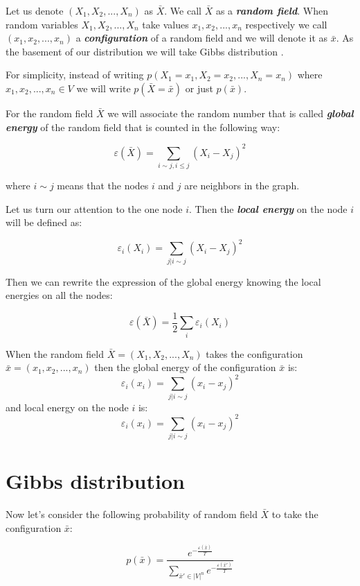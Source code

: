 \documentclass[12pt]{report}
\begin{document}
Let us denote $(X_1, X_2, ..., X_n)$ as $\bar{X}$. We call $\bar{X}$ as a \textit{\textbf{random field}}. When random variables $X_1, X_2, ..., X_n$ take values $x_1, x_2, ..., x_n$ respectively we call $(x_1, x_2, ..., x_n)$ a \textit{\textbf{configuration}} of a random field and we will denote it as $\bar{x}$. As the basement of our distribution we will take Gibbs distribution \cite{bremaud2013markov}.

For simplicity, instead of writing $p(X_1 = x_1, X_2 = x_2, ...,  X_n = x_n)$ where $x_1, x_2, ..., x_n \in V$ we will write $p(\bar{X} = \bar{x})$ or just $p(\bar{x})$.

For the random field $\bar{X}$ we will associate the random number that is called \textit{\textbf{global energy}} of the random field that is counted in the following way:

$$ \varepsilon (\bar{X}) =  \sum\limits_{i \sim j, i \leq j} (X_i - X_j)^2  $$


where $i \sim j$ means that the nodes $i$ and $j$ are neighbors in the graph.

Let us turn our attention to the one node $i$. Then the \textit{\textbf{local energy}} on the node $i$ will be defined as:

$$ \varepsilon_i (X_i) = \sum\limits_{j | i \sim j}  (X_i - X_j)^2 $$  

Then we can rewrite the expression of the global energy knowing the local energies on all the nodes:

$$ \varepsilon (\bar{X}) = \frac{1}{2}\sum_i \varepsilon_i(X_i)$$

When the random field $\bar{X} = (X_1, X_2, ..., X_n)$ takes the configuration $\bar{x} = (x_1, x_2, ..., x_n)$ then the global energy of the configuration $\bar{x}$ is:
$$ \varepsilon_i (x_i) = \sum\limits_{j | i \sim j}  (x_i - x_j)^2 $$  
and local energy on the node $i$ is:
$$ \varepsilon_i (x_i) = \sum\limits_{j | i \sim j}  (x_i - x_j)^2 $$  

\section{Gibbs distribution}

Now let's consider the following probability  of random field $\bar{X}$ to take the configuration $\bar{x}$:

\begin{equation} \label{eq:gibbsdistr}
p(\bar{x}) = \frac{ e^{-\frac{ \varepsilon (\bar{x})}{T}} }{ \sum\limits_{\bar{x}'\in |V|^n} e^{-\frac{\varepsilon(\bar{x}')}{T}}} 
\end{equation}
\end{document}
